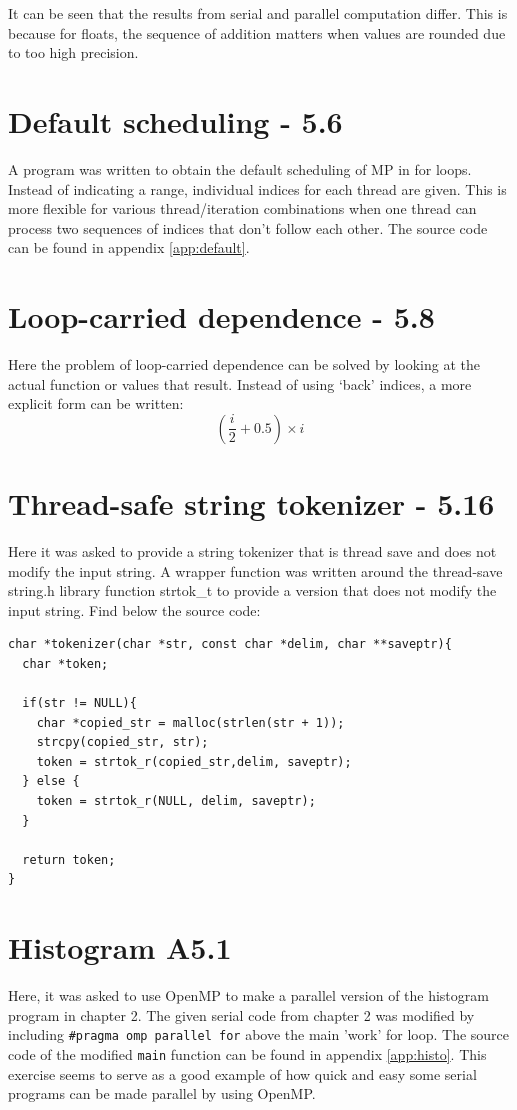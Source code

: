 \documentclass[a4paper,11pt,twoside]{article}
\begin{document}
It can be seen that the results from serial and parallel computation differ. This is because for floats, the sequence of addition matters when values are rounded due to too high precision. 

\section{Default scheduling - 5.6}
A program was written to obtain the default scheduling of MP in for loops. Instead of indicating a range, individual indices for each thread are given. This is more flexible for various thread/iteration combinations when one thread can process two sequences of indices that don't follow each other. The source code can be found in appendix \ref{app:default}.  

\section{Loop-carried dependence - 5.8}
Here the problem of loop-carried dependence can be solved by looking at the actual function or values that result. Instead of using `back' indices, a more explicit form can be written:
\begin{equation}
(\frac{i}{2} + 0.5)\times i  
\end{equation}

\section{Thread-safe string tokenizer - 5.16}
Here it was asked to provide a string tokenizer that is thread save and does not modify the input string.
A wrapper function was written around the thread-save string.h library function strtok\_t to provide a version that does not modify the input string. Find below the source code:
\begin{verbatim}
char *tokenizer(char *str, const char *delim, char **saveptr){
  char *token;

  if(str != NULL){
    char *copied_str = malloc(strlen(str + 1));
    strcpy(copied_str, str);
    token = strtok_r(copied_str,delim, saveptr);
  } else {
    token = strtok_r(NULL, delim, saveptr); 
  }

  return token; 
}
\end{verbatim}

\section{Histogram A5.1}
Here, it was asked to use OpenMP to make a parallel version of the histogram program in chapter 2. The given serial code from chapter 2 was modified by including \verb+#pragma omp parallel for+ above the main 'work' for loop. The source code of the modified \verb+main+ function can be found in appendix \ref{app:histo}. This exercise seems to serve as a good example of how quick and easy some serial programs can be made parallel by using OpenMP.
\end{document}
